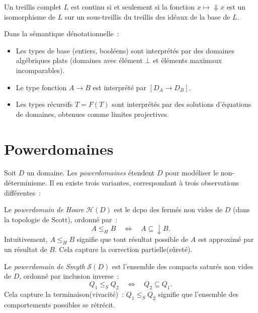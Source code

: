 \begin{theoreme}
Un treillis complet $L$ est continu si et seulement si la fonction
$x \mapsto {\Downarrow} x$ est un isomorphisme de $L$ sur un sous-treillis du treillis
des id\'eaux de la base de $L$.
\end{theoreme}

\begin{proposition}
Dans la s\'emantique d\'enotationnelle~:
\begin{itemize}
  \item Les types de base (entiers, bool\'eens) sont interpr\'et\'es par des domaines
    alg\'ebriques plats (domaines avec \'el\'ement $\bot$ et \'el\'ements maximaux incomparables).
  \item Le type fonction $A \to B$ est interpr\'et\'e par $[D_A \to D_B]$.
  \item Les types r\'ecursifs $T = F(T)$ sont interpr\'et\'es par des solutions d'\'equations
    de domaines, obtenues comme limites projectives.
\end{itemize}
\end{proposition}

\section{Powerdomaines}

\begin{definition}[Powerdomaines]
Soit $D$ un domaine. Les \emph{powerdomaines} \'etendent $D$ pour mod\'eliser le
non-d\'eterminisme. Il en existe trois variantes, correspondant \`a trois observations
diff\'erentes~:
\end{definition}

\begin{definition}
Le \emph{powerdomain de Hoare} $\mathcal{H}(D)$ est le dcpo des ferm\'es non vides de $D$
(dans la topologie de Scott), ordonn\'e par~:
\[
  A \leq_H B \quad \Longleftrightarrow \quad A \subseteq {\downarrow} B.
\]
Intuitivement, $A \leq_H B$ signifie que tout r\'esultat possible de $A$ est approxim\'e
par un r\'esultat de $B$. Cela capture la \og{}correction partielle\fg (s\^uret\'e).
\end{definition}

\begin{definition}
Le \emph{powerdomain de Smyth} $\mathcal{S}(D)$ est l'ensemble des compacts satur\'es
non vides de $D$, ordonn\'e par inclusion inverse~:
\[
  Q_1 \leq_S Q_2 \quad \Longleftrightarrow \quad Q_2 \subseteq Q_1.
\]
Cela capture la \og{}terminaison\fg (vivacit\'e)~: $Q_1 \leq_S Q_2$ signifie que
l'ensemble des comportements possibles se r\'etr\'ecit.
\end{definition}

